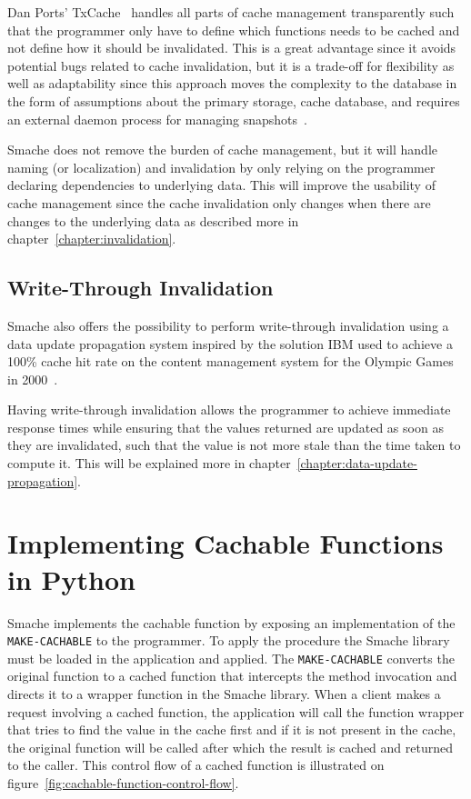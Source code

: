 Dan Ports' TxCache~\cite{paper:liskov} handles all parts of cache management transparently such that the programmer only have to define which functions needs to be cached and not define how it should be invalidated. This is a great advantage since it avoids potential bugs related to cache invalidation, but it is a trade-off for flexibility as well as adaptability since this approach moves the complexity to the database in the form of assumptions about the primary storage, cache database, and requires an external daemon process for managing snapshots~\cite{paper:liskov}.

Smache does not remove the burden of cache management, but it will handle naming (or localization) and invalidation by only relying on the programmer declaring dependencies to underlying data. This will improve the usability of cache management since the cache invalidation only changes when there are changes to the underlying data as described more in chapter~\ref{chapter:invalidation}.


\subsection{Write-Through Invalidation}
\label{subsec:write-through-updates}

Smache also offers the possibility to perform write-through invalidation using a data update propagation system inspired by the solution IBM used to achieve a 100\% cache hit rate on the content management system for the Olympic Games in 2000~\cite{paper:ibm, paper:ibm-extended}.

Having write-through invalidation allows the programmer to achieve immediate response times while ensuring that the values returned are updated as soon as they are invalidated, such that the value is not more stale than the time taken to compute it. This will be explained more in chapter~\ref{chapter:data-update-propagation}.


\section{Implementing Cachable Functions in Python}
\label{sec:implementing_cachable_functions_in_python}

Smache implements the cachable function by exposing an implementation of the \verb$MAKE-CACHABLE$ to the programmer. To apply the procedure the Smache library must be loaded in the application and applied. The \verb$MAKE-CACHABLE$ converts the original function to a cached function that intercepts the method invocation and directs it to a wrapper function in the Smache library. When a client makes a request involving a cached function, the application will call the function wrapper that tries to find the value in the cache first and if it is not present in the cache, the original function will be called after which the result is cached and returned to the caller. This control flow of a cached function is illustrated on figure~\ref{fig:cachable-function-control-flow}.

